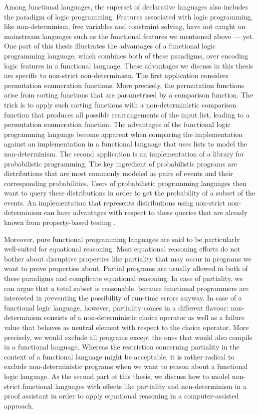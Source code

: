 Among functional languages, the superset of declarative languages also includes the paradigm of logic programming.
Features associated with logic programming, like non\--determinism, free variables and constraint solving, have not caught on mainstream languages such as the functional features we mentioned above --- yet.
One part of this thesis illustrates the advantages of a functional logic programming language, which combines both of these paradigms, over encoding logic features in a functional language.
These advantages we discuss in this thesis are specific to non\--strict non\--determinism.
The first application considers permutation enumeration functions.
More precisely, the permutation functions arise from sorting functions that are parametrised by a comparison function.
The trick is to apply such sorting functions with a non\--deterministic comparison function that produces all possible rearrangements of the input list, leading to a permutation enumeration function.
The advantages of the functional logic programming language become apparent when comparing the implementation against an implementation in a functional language that uses lists to model the non\--determinism.
The second application is an implementation of a library for probabilistic programming.
The key ingredient of probabilistic programs are distributions that are most commonly modeled as pairs of events and their corresponding probabilities.
Users of probabilistic programming languages then want to query these distributions in order to get the probability of a subset of the events.
An implementation that represents distributions using non\--strict non\--determinism can have advantages with respect to these queries that are already known from property\--based testing \citep{christiansen2008easycheck,runciman2008smallcheck}.

Moreover, pure functional programming languages are said to be particularly well\--suited for equational reasoning.
Most equational reasoning efforts do not bother about disruptive properties like partiality that may occur in programs we want to prove properties about.
Partial programs are usually allowed in both of these paradigms and complicate equational reasoning.
In case of partiality, we can argue that a total subset is reasonable, because functional programmers are interested in preventing the possibility of run\--time errors anyway.
In case of a functional logic language, however, partiality comes in a different flavour: non\--determinism consists of a non\--deterministic choice operator as well as a failure value that behaves as neutral element with respect to the choice operator.
More precisely, we would exclude all programs except the ones that would also compile in a functional language.
Whereas the restriction concerning partiality in the context of a functional language might be acceptable, it is rather radical to exclude non\--deterministic programs when we want to reason about a functional logic language.
As the second part of this thesis, we discuss how to model non\--strict functional languages with effects like partiality and non\--determinism in a proof assistant in order to apply equational reasoning in a computer\--assisted approach.

